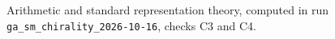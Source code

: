 Arithmetic and standard representation theory, computed in run \texttt{ga\_sm\_chirality\_2026-10-16}, checks C3 and C4.
